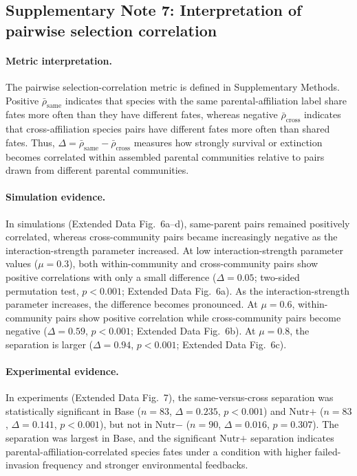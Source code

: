 \subsection*{Supplementary Note 7: Interpretation of pairwise selection correlation}
\label{sec:suppl:note7}

\paragraph{Metric interpretation.}
The pairwise selection-correlation metric is defined in Supplementary Methods. Positive $\bar{\rho}_{\text{same}}$ indicates that species with the same parental-affiliation label share fates more often than they have different fates, whereas negative $\bar{\rho}_{\text{cross}}$ indicates that cross-affiliation species pairs have different fates more often than shared fates. Thus, $\Delta=\bar{\rho}_{\text{same}}-\bar{\rho}_{\text{cross}}$ measures how strongly survival or extinction becomes correlated within assembled parental communities relative to pairs drawn from different parental communities.

\paragraph{Simulation evidence.}
In simulations (Extended Data Fig.~6a--d), same-parent pairs remained positively correlated, whereas cross-community pairs became increasingly negative as the interaction-strength parameter increased. At low interaction-strength parameter values ($\mu = 0.3$), both within-community and cross-community pairs show positive correlations with only a small difference ($\Delta = 0.05$; two-sided permutation test, $p < 0.001$; Extended Data Fig.~6a). As the interaction-strength parameter increases, the difference becomes pronounced. At $\mu = 0.6$, within-community pairs show positive correlation while cross-community pairs become negative ($\Delta = 0.59$, $p < 0.001$; Extended Data Fig.~6b). At $\mu = 0.8$, the separation is larger ($\Delta = 0.94$, $p < 0.001$; Extended Data Fig.~6c).

\paragraph{Experimental evidence.}
In experiments (Extended Data Fig.~7), the same-versus-cross separation was statistically significant in Base ($n=83$, $\Delta=0.235$, $p < 0.001$) and Nutr$+$ ($n=83$, $\Delta=0.141$, $p < 0.001$), but not in Nutr$-$ ($n=90$, $\Delta=0.016$, $p=0.307$). The separation was largest in Base, and the significant Nutr$+$ separation indicates parental-affiliation-correlated species fates under a condition with higher failed-invasion frequency and stronger environmental feedbacks.

